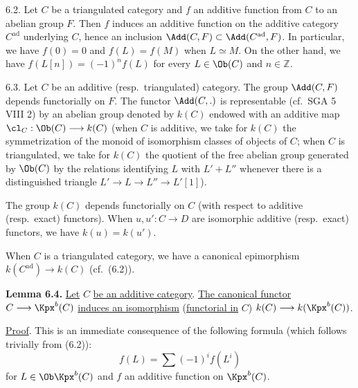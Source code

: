 %
6.2. Let \(C\) be a triangulated category and \(f\) an additive function from \(C\) to an abelian group \(F\). Then \(f\) induces an additive function on the additive category \(C^{\mathrm{ad}}\) underlying \(C\), hence an inclusion \(\Add(C,F)\subset\Add(C^{\mathrm{ad}},F)\). In particular, we have \(f(0)=0\) and \(f(L)=f(M)\) when \(L\simeq M\). On the other hand, we have \(f(L[n])=(-1)^n f(L)\) for every \(L\in\Ob(C)\) and \(n\in\mathbb Z\).

6.3. Let \(C\) be an additive (resp.\ triangulated) category. The group \(\Add(C,F)\) depends functorially on \(F\). The functor \(\Add(C,.)\) is representable (cf.\ SGA 5 VIII 2) by an abelian group denoted by \(k(C)\) endowed with an additive map \(\cl_{C}:\Ob(C)\longrightarrow k(C)\) (when \(C\) is additive, we take for \(k(C)\) the symmetrization of the monoid of isomorphism classes of objects of \(C\); when \(C\) is triangulated, we take for \(k(C)\) the quotient of the free abelian group generated by \(\Ob(C)\) by the relations identifying \(L\) with \(L'+L''\) whenever there is a distinguished triangle \(L'\longrightarrow L\longrightarrow L''\longrightarrow L'[1]\)).

The group \(k(C)\) depends functorially on \(C\) (with respect to additive (resp.\ exact) functors). When \(u,u':C\to D\) are isomorphic additive (resp.\ exact) functors, we have \(k(u)=k(u')\).

When \(C\) is a triangulated category, we have a canonical epimorphism \(k(C^{\mathrm{ad}})\longrightarrow k(C)\) (cf.\ (6.2)).

\textbf{Lemma 6.4.} \uline{Let} \(C\) \uline{be an additive category}. \uline{The canonical functor} \(C\longrightarrow\Kpx^b(C)\) \uline{induces an isomorphism} (\uline{functorial in} \(C\)) \(k(C)\longrightarrow k(\Kpx^b(C))\).

\uline{Proof}. This is an immediate consequence of the following formula (which follows trivially from (6.2)):
\begin{equation}\tag{6.4.1}
  f(L)=\sum (-1)^i f(L^i)
\end{equation}
%
for \(L\in\Ob\Kpx^b(C)\) and \(f\) an additive function on \(\Kpx^b(C)\).

